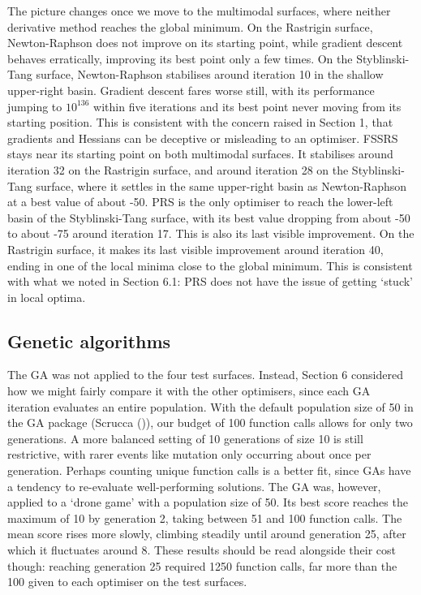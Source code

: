\documentclass[
  a4paper,
  DIV=11,
  numbers=noendperiod]{scrartcl}
\newcommand{\+}{\phantom{-}}
\begin{document}
The picture changes once we move to the multimodal surfaces, where
neither derivative method reaches the global minimum. On the Rastrigin
surface, Newton-Raphson does not improve on its starting point, while
gradient descent behaves erratically, improving its best point only a
few times. On the Styblinski-Tang surface, Newton-Raphson stabilises
around iteration 10 in the shallow upper-right basin. Gradient descent
fares worse still, with its performance jumping to \(10^{136}\) within
five iterations and its best point never moving from its starting
position. This is consistent with the concern raised in Section 1, that
gradients and Hessians can be deceptive or misleading to an optimiser.
FSSRS stays near its starting point on both multimodal surfaces. It
stabilises around iteration 32 on the Rastrigin surface, and around
iteration 28 on the Styblinski-Tang surface, where it settles in the
same upper-right basin as Newton-Raphson at a best value of about -50.
PRS is the only optimiser to reach the lower-left basin of the
Styblinski-Tang surface, with its best value dropping from about -50 to
about -75 around iteration 17. This is also its last visible
improvement. On the Rastrigin surface, it makes its last visible
improvement around iteration 40, ending in one of the local minima close
to the global minimum. This is consistent with what we noted in Section
6.1: PRS does not have the issue of getting `stuck' in local optima.

\subsection{Genetic algorithms}\label{genetic-algorithms}

The GA was not applied to the four test surfaces. Instead, Section 6
considered how we might fairly compare it with the other optimisers,
since each GA iteration evaluates an entire population. With the default
population size of 50 in the GA package (Scrucca
()), our budget of 100 function calls
allows for only two generations. A more balanced setting of 10
generations of size 10 is still restrictive, with rarer events like
mutation only occurring about once per generation. Perhaps counting
unique function calls is a better fit, since GAs have a tendency to
re-evaluate well-performing solutions. The GA was, however, applied to a
`drone game' with a population size of 50. Its best score reaches the
maximum of 10 by generation 2, taking between 51 and 100 function calls.
The mean score rises more slowly, climbing steadily until around
generation 25, after which it fluctuates around 8. These results should
be read alongside their cost though: reaching generation 25 required
1250 function calls, far more than the 100 given to each optimiser on
the test surfaces.
\end{document}
